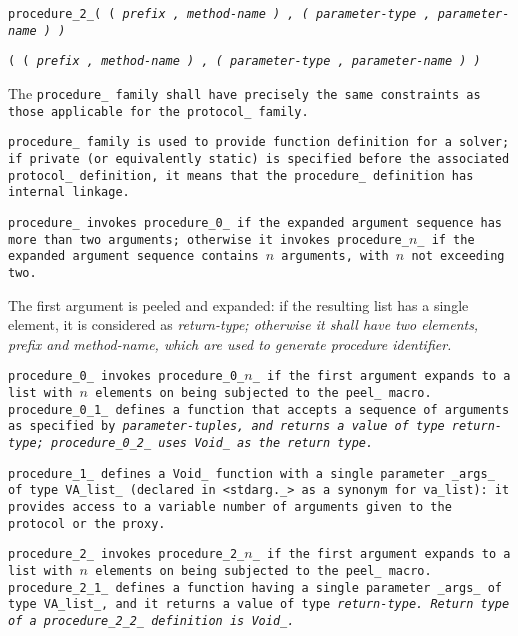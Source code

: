 \tt {procedure_2_}\s\s\s\tt{(} \tt{(} \it{prefix} \tt{,} \it{method-name} \tt{)}
\tt{,} \tt{(} \it{parameter-type} \tt{,} \it{parameter-name} \tt{)} \tt{)}

\s\tt{(} \tt{(} \it{prefix} \tt{,} \it{method-name} \tt{)}
\tt{,} \tt{(} \it{parameter-type} \tt{,} \it{parameter-name} \tt{)} \tt{)}


The \tt{procedure_} family shall have precisely the same
constraints as those applicable for the \tt{protocol_} family.


\tt{procedure_} family is used to provide function definition
for a solver; if \tt{private} (or equivalently \tt{static})
is specified before the associated \tt{protocol_} definition,
it means that the \tt{procedure_} definition has internal linkage.

\tt{procedure_} invokes \tt{procedure_0_} if the expanded argument sequence has
more than two arguments; otherwise it invokes \tt{procedure_}$n$\tt{_} if the
expanded argument sequence contains $n$ arguments, with $n$ not exceeding two.

The first argument is peeled and expanded: if the resulting list
has a single element, it is considered as \it{return-type};
otherwise it shall have two elements, \it{prefix} and
\it{method-name}, which are used to generate procedure identifier.

\tt{procedure_0_} invokes \tt{procedure_0_}$n$\_ if the first argument expands
to a list with $n$ elements on being subjected to the \tt{peel_} macro.
\tt{procedure_0_1_} defines a function that accepts a sequence of arguments as
specified by \it{parameter-tuples}, and returns a value of type
\it{return-type}; \tt{procedure_0_2_} uses \tt{Void_} as the return type.

\tt{procedure_1_} defines a \tt{Void_} function with a single parameter
\tt{_args_} of type \tt{VA_list_} (declared in \tt{<stdarg._>}
as a synonym for \tt{va_list}): it provides access to a variable
number of arguments given to the protocol or the proxy.

\tt{procedure_2_} invokes \tt{procedure_2_}$n$\_ if the first argument expands
to a list with $n$ elements on being subjected to the \tt{peel_} macro.
\tt{procedure_2_1_} defines a function having a single parameter \tt{_args_}
of type \tt{VA_list_}, and it returns a value of type \it{return-type}.
Return type of a \tt{procedure_2_2_} definition is \tt{Void_}.

